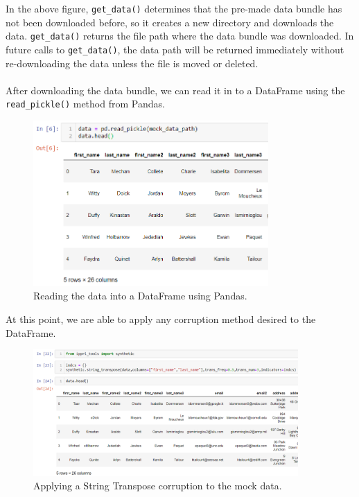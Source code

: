 \documentclass[titlepage, 11pt]{article}
\begin{document}
\noindent In the above figure, \verb|get_data()| determines that the pre-made data bundle has not been downloaded before, so it creates a new directory and downloads the data. \verb|get_data()| returns the file path where the data bundle was downloaded. In future calls to \verb|get_data()|, the data path will be returned immediately without re-downloading the data unless the file is moved or deleted. 
\\
\\
\noindent After downloading the data bundle, we can read it in to a DataFrame using the \verb|read_pickle()| method from Pandas.

\begin{figure}[H]
    \centering
    \includegraphics[width=0.8\textwidth]{imgs/mock_data2.PNG}
    \caption{Reading the data into a DataFrame using Pandas.}
    \label{fig:dataread}
\end{figure}

\noindent At this point, we are able to apply any corruption method desired to the DataFrame. 

\begin{figure}[H]
    \centering
    \includegraphics[width=0.9\textwidth]{imgs/mock_data3.PNG}
    \caption{Applying a String Transpose corruption to the mock data.}
    \label{fig:datacorrupt}
\end{figure}
\end{document}
